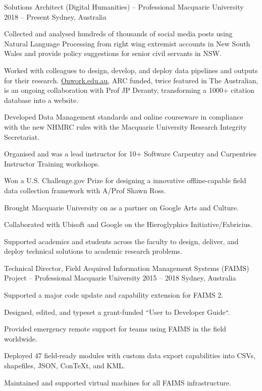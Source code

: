 \begin{cventries}
\cventry
    {Solutions Architect (Digital Humanities) -- Professional} %
    {Macquarie University} %
    {2018 -- Present} %
    {Sydney, Australia} %
    {\begin{cvitems}%
    \item {Collected and analysed hundreds of thousands of social media posts using Natural Language Processing from right wing extremist accounts in New South Wales and provide policy suggestions for senior civil servants in NSW.}
    \item {Worked with colleagues to design, develop, and deploy data pipelines and outputs for their research. \href{https://onwork.edu.au}{Onwork.edu.au}, ARC funded, twice featured in The Australian, is an ongoing collaboration with Prof JP Deranty, transforming a 1000+ citation database into a website.}
    \item {Developed Data Management standards and online courseware in compliance with the new NHMRC rules with the Macquarie University Research Integrity Secretariat.}
    \item {Organised and was a lead instructor for 10+ Software Carpentry and Carpentries Instructor Training workshops.}
    \item {Won a U.S. Challenge.gov Prize for designing a innovative offline-capable field data collection framework with A/Prof Shawn Ross.}
    \item {Brought Macquarie University on as a partner on Google Arts and Culture.}
    \item {Collaborated with Ubisoft and Google on the Hieroglyphics Initiative/Fabricius.}
    \item {Supported academics and students across the faculty to design, deliver, and deploy technical solutions to academic research problems.}
    \end{cvitems}%
    }
    \cventry
    {Technical Director, Field Acquired Information Management Systems (FAIMS) Project -- Professional} %
    {Macquarie University} %
    {2015 -- 2018} %
    {Sydney, Australia} %
    {\begin{cvitems}%
    \item {Supported a major code update and capability extension for FAIMS 2.}
    \item {Designed, edited, and typeset a grant-funded ``User to Developer Guide``.}
    \item {Provided emergency remote support for teams using FAIMS in the field worldwide.}
    \item {Deployed 47 field-ready modules with custom data export capabilities into CSVs, shapefiles, JSON, Con\TeX{}t, and KML.}
    \item {Maintained and supported virtual machines for all FAIMS infrastructure.}
\end{cvitems}}
 

\end{cventries}

